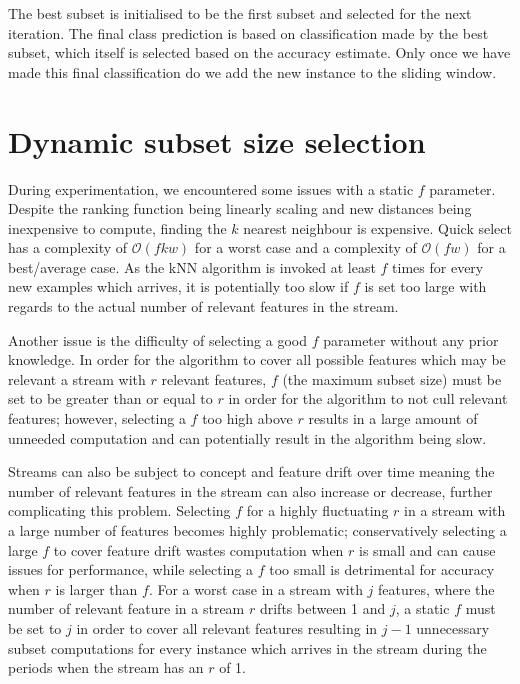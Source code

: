 The best subset is initialised to be the first subset and selected for the next iteration. The final class prediction is based on classification made by the best subset, which itself is selected based on the accuracy estimate. Only once we have made this final classification do we add the new instance to the sliding window.

\section{Dynamic subset size selection}
During experimentation, we encountered some issues with a static $f$ parameter. Despite the ranking function being linearly scaling and new distances being inexpensive to compute, finding the $k$ nearest neighbour is expensive. Quick select has a complexity of $\mathcal{O}(fkw)$ for a worst case and a complexity of $\mathcal{O}(fw)$ for a best/average case. As the kNN algorithm is invoked at least $f$ times for every new examples which arrives, it is potentially too slow if $f$ is set too large with regards to the actual number of relevant features in the stream.

Another issue is the difficulty of selecting a good $f$ parameter without any prior knowledge. In order for the algorithm to cover all possible features which may be relevant a stream with $r$ relevant features, $f$ (the maximum subset size) must be set to be greater than or equal to $r$ in order for the algorithm to not cull relevant features; however, selecting a $f$ too high above $r$ results in a large amount of unneeded computation and can potentially result in the algorithm being slow. 

Streams can also be subject to concept and feature drift over time meaning the number of relevant features in the stream can also increase or decrease, further complicating this problem. Selecting $f$ for a highly fluctuating $r$ in a stream with a large number of features becomes highly problematic; conservatively selecting a large $f$ to cover feature drift wastes computation when $r$ is small and can cause issues for performance, while selecting a $f$ too small is detrimental for accuracy when $r$ is larger than $f$. For a worst case in a stream with $j$ features, where the number of relevant feature in a stream $r$ drifts between 1 and $j$, a static $f$ must be set to $j$ in order to cover all relevant features resulting in $j-1$ unnecessary subset computations for every instance which arrives in the stream during the periods when the stream has an $r$ of 1.

